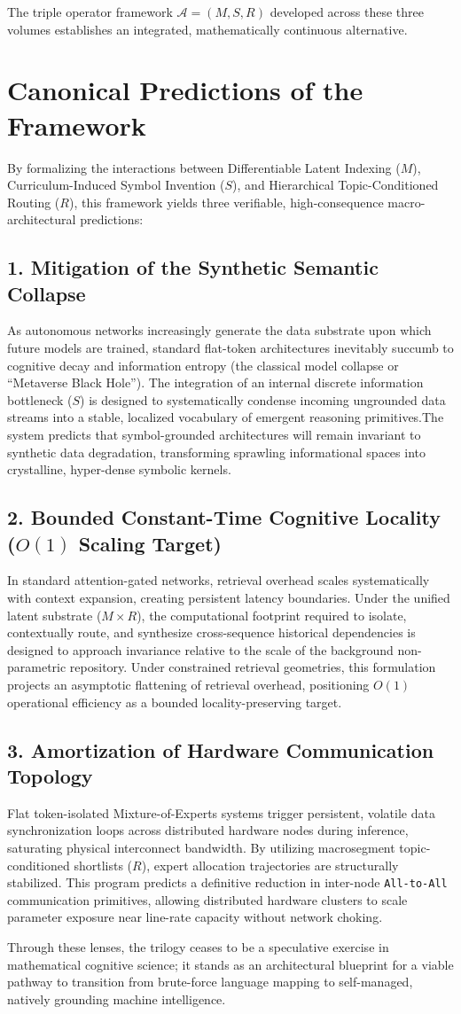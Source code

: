 The triple operator framework $\mathcal{A} = (M, S, R)$ developed across these three volumes establishes an integrated, mathematically continuous alternative. 

\section*{Canonical Predictions of the Framework}

By formalizing the interactions between Differentiable Latent Indexing ($M$), Curriculum-Induced Symbol Invention ($S$), and Hierarchical Topic-Conditioned Routing ($R$), this framework yields three verifiable, high-consequence macro-architectural predictions:

\subsection*{1. Mitigation of the Synthetic Semantic Collapse}
As autonomous networks increasingly generate the data substrate upon which future models are trained, standard flat-token architectures inevitably succumb to cognitive decay and information entropy (the classical model collapse or ``Metaverse Black Hole''). The integration of an internal discrete information bottleneck (\(S\)) is designed to systematically condense incoming ungrounded data streams into a stable, localized vocabulary of emergent reasoning primitives.The system predicts that symbol-grounded architectures will remain invariant to synthetic data degradation, transforming sprawling informational spaces into crystalline, hyper-dense symbolic kernels.

\subsection*{2. Bounded Constant-Time Cognitive Locality ($O(1)$ Scaling Target)}
In standard attention-gated networks, retrieval overhead scales systematically with context expansion, creating persistent latency boundaries. Under the unified latent substrate ($M \times R$), the computational footprint required to isolate, contextually route, and synthesize cross-sequence historical dependencies is designed to approach invariance relative to the scale of the background non-parametric repository. Under constrained retrieval geometries, this formulation projects an asymptotic flattening of retrieval overhead, positioning $O(1)$ operational efficiency as a bounded locality-preserving target.

\subsection*{3. Amortization of Hardware Communication Topology}
Flat token-isolated Mixture-of-Experts systems trigger persistent, volatile data synchronization loops across distributed hardware nodes during inference, saturating physical interconnect bandwidth. By utilizing macrosegment topic-conditioned shortlists ($R$), expert allocation trajectories are structurally stabilized. This program predicts a definitive reduction in inter-node \texttt{All-to-All} communication primitives, allowing distributed hardware clusters to scale parameter exposure near line-rate capacity without network choking.

Through these lenses, the trilogy ceases to be a speculative exercise in mathematical cognitive science; it stands as an architectural blueprint for a viable pathway to transition from brute-force language mapping to self-managed, natively grounding machine intelligence.